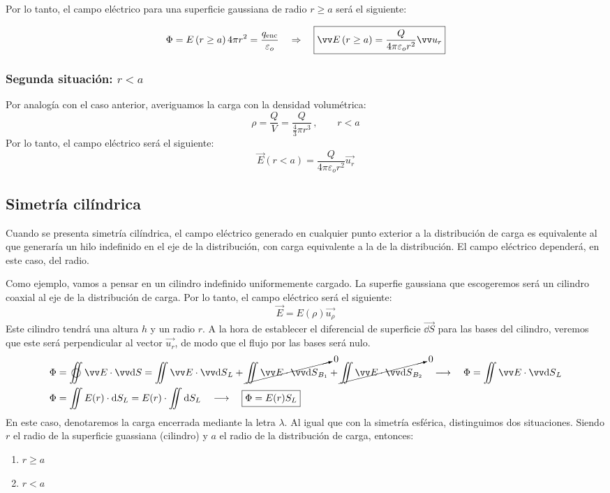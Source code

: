 \documentclass[a4paper]{book}
\begin{document}
Por lo tanto, el campo eléctrico para una superficie gaussiana de radio $r\geq a$ será el siguiente:

\[\Phi = E\left( r\geq a \right)4\pi r^2 =\frac{q\subtext{enc}}{\varepsilon_o} \quad \Rightarrow \quad \boxed{\vec{E}\left( r\geq a \right) = \frac{Q}{4\pi \varepsilon_o r^2}\vec{u_r}}\]


\subsubsection{Segunda situación: $r<a$}
Por analogía con el caso anterior, averiguamos la carga con la densidad volumétrica:
\[\rho = \frac{Q}{V} = \frac{Q}{\frac{4}{3}\pi r^3} \, , \qquad r<a\]
Por lo tanto, el campo eléctrico será el siguiente:
\[\boxed{\vec{E}\left( r<a \right) = \frac{Q}{4\pi \varepsilon_o r^2}\vec{u_r}}\]


\subsection{Simetría cilíndrica}
Cuando se presenta simetría cilíndrica, el campo eléctrico generado en cualquier punto exterior a la distribución de carga es equivalente al que generaría un hilo indefinido en el eje de la distribución, con carga equivalente a la de la distribución. El campo eléctrico dependerá, en este caso, del radio.

Como ejemplo, vamos a pensar en un cilindro indefinido uniformemente cargado. La superfie gaussiana que escogeremos será un cilindro coaxial al eje de la distribución de carga. Por lo tanto, el campo eléctrico será el siguiente:
\[\vec{E}=E(\rho)\vec{u_\rho}\]
Este cilindro tendrá una altura $h$ y un radio $r$. A la hora de establecer el diferencial de superficie $\vec{\dd S}$ para las bases del cilindro, veremos que este será perpendicular al vector $\vec{u_r}$, de modo que el flujo por las bases será nulo.
\begin{align*}
	\Phi & = \varoiint \vec{E}\cdot \vec{\dd S} = \iint \vec{E}\cdot \vec{\dd S}_L + \cancelto{0}{\iint \vec{E}\cdot \vec{\dd S}_{B_1}} + \cancelto{0}{\iint \vec{E}\cdot \vec{\dd S}_{B_2}} \quad \longrightarrow \quad \Phi = \iint \vec{E}\cdot \vec{\dd S}_L \\
	\Phi & = \iint E(r)\cdot \dd S_L = E(r) \cdot \iint \dd S_L \quad \longrightarrow \quad \boxed{\Phi = E(r) S_L}
\end{align*}
En este caso, denotaremos la carga encerrada mediante la letra $\lambda$. Al igual que con la simetría esférica, distinguimos dos situaciones. Siendo $r$ el radio de la superficie guassiana (cilindro) y $a$ el radio de la distribución de carga, entonces:
\begin{enumerate}
	\item $r\geq a$
	\item $r<a$
\end{enumerate}
\end{document}

